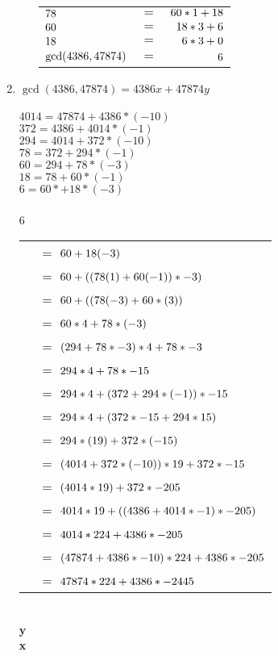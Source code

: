 \documentclass[8pt,a4paper]{article}
\begin{document}
\begin{enumerate}[itemsep=20pt]
\begin{enumerate}
\begin{tabular}[t]{l c r}
				\($$78$$\) 	& \(=\) & \($$60*1+18$$\)\\ 				
				\($$60$$\) 	& \(=\) & \($$18*3+6$$\)\\
				\($$18$$\) 	& \(=\) & \($$6*3+0$$\)\\
				\($$\gcd(4386,47874)$$\) & \(=\) & \($$6$$\)\\
			\end{tabular}	
	\end{enumerate}
\item
	$\gcd(4386,47874) = 4386x+47874y$\\
	\\
	$4014 = 47874+4386*(-10)$\\
	$372 = 4386+4014*(-1)$\\
	$294 = 4014+372*(-10)$\\
	$78 = 372+294*(-1)$\\
	$60 = 294+78*(-3)$\\
	$18 = 78+60*(-1)$\\
	$6 = 60*+18*(-3)$\\
	
	\\
	6 \begin{tabular}[t]{l l}
	  & \(=\) \($$60+18(-3) $$\)\\ 					
	  & \(=\) \( $$60+((78(1)+60(-1))*-3)$$\)\\ 		
	  & \(=\) \($$60+((78(-3)+60*(3))$$\)\\			
	  & \(=\) \($$60*4+78*(-3)$$\)\\ 					
	  & \(=\) \( $$(294+78*-3)*4+78*-3$$\)\\ 			
	  & \(=\) \($$294*4+78*-15$$\)\\
	  & \(=\) \($$294*4+(372+294*(-1))*-15$$\)\\ 		
	  & \(=\) \( $$294*4+(372*-15+294*15)$$\)\\ 		
	  & \(=\) \($$294*(19)+372*(-15)$$\)\\	  		
	  & \(=\) \($$(4014+372*(-10))*19+372*-15$$\)\\ 	
	  & \(=\) \( $$(4014*19)+372*-205$$\)\\ 			
	  & \(=\) \($$4014*19+((4386+4014*-1)*-205)$$\)\\
	  & \(=\) \($$4014*224+4386*-205$$\)\\ 			
	  & \(=\) \( $$(47874+4386*-10)*224+4386*-205$$\)\\
	  & \(=\) \($$47874*224+4386*-2445$$\)\\
	  \end{tabular}\\	  
	   \textbf{y} \\
	   \textbf{x} \\
	   

\end{enumerate}
\end{document}
